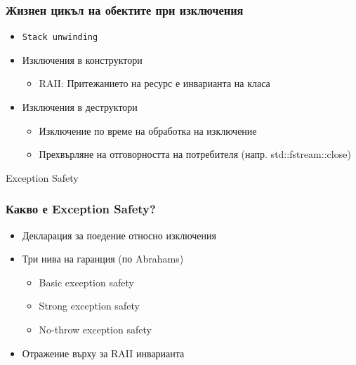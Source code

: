 \documentclass{beamer}
\begin{document}
\begin{frame}[fragile]
  \frametitle{Жизнен цикъл на обектите при изключения}

  \begin{itemize}
    \item \texttt{Stack unwinding}
    \item Изключения в конструктори
    \begin{itemize}
        \item RAII: Притежанието на ресурс е инварианта на класа
    \end{itemize}    
    \item Изключения в деструктори
    \begin{itemize}
      \item Изключение по време на обработка на изключение
      \item Прехвърляне на отговорността на потребителя (напр. std::fstream::close)
    \end{itemize}
  \end{itemize}

\end{frame}

\begin{frame}
\centerline{Exception Safety}
\end{frame}

\begin{frame}[fragile]
\frametitle{Какво е Exception Safety?}

\begin{itemize}
  \item Декларация за поедение относно изключения
  \item Три нива на гаранция (по Abrahams)
  \begin{itemize}
    \item Basic exception safety
    \item Strong exception safety  
    \item No-throw exception safety
  \end{itemize}
  \item Отражение върху за RAII инварианта
\end{itemize}

\end{frame}
\end{document}
